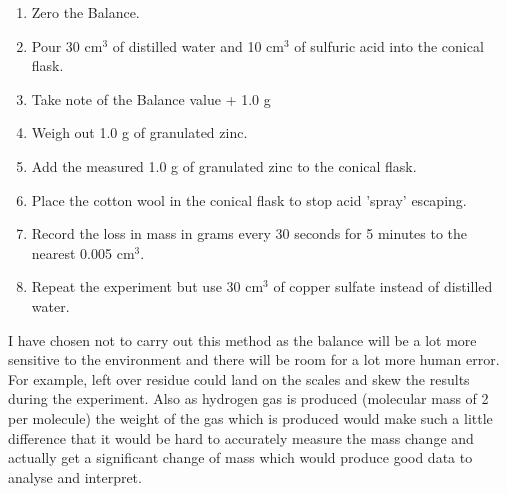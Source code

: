 \begin{enumerate}
\item Zero the Balance.
\item Pour 30 cm$^3$ of distilled water and 10 cm$^3$ of sulfuric acid into the conical flask.
\item Take note of the Balance value + 1.0 g
\item Weigh out 1.0 g of granulated zinc.
\item Add the measured 1.0 g of granulated zinc to the conical flask.
\item Place the cotton wool in the conical flask to stop acid 'spray' escaping.
\item Record the loss in mass in grams every 30 seconds for 5 minutes to the nearest 0.005 cm$^3$.
\item Repeat the experiment but use 30 cm$^3$ of copper sulfate instead of distilled water.
\end{enumerate} 

I have chosen not to carry out this method as the balance will be a lot more sensitive to the environment and there will be room for a lot more human error. For example, left over residue could land on the scales and skew the results during the experiment. Also as hydrogen gas is produced (molecular mass of 2 per molecule) the weight of the gas which is produced would make such a little difference that it would be hard to accurately measure the mass change and actually get a significant change of mass which would produce good data to analyse and interpret. 


